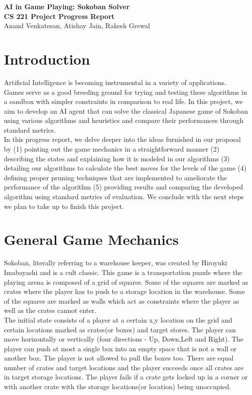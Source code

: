 \documentclass[10pt, final]{article}
\newcommand{\br}[1][.75]{\ \\[#1\baselineskip]}
\begin{document}
	\begin{center}
		\LARGE{\textbf{AI in Game Playing: Sokoban Solver}}\\
		\Large{\textbf{CS 221 Project Progress Report}}\\
		\Large{Anand Venkatesan, Atishay Jain, Rakesh Grewal }
	\end{center}
	\begin{multicols}{2}	
	\section{Introduction}
	Artificial Intelligence is becoming instrumental in a variety of applications. Games serve as a good breeding ground for trying and testing these algorithms in a sandbox with simpler constraints in comparison to real life.	In this project, we aim to develop an AI agent that can solve the classical Japanese game of Sokoban using various algorithms and heuristics
	and compare their performances through standard metrics. \br 
	In this progress report, we delve deeper into the ideas furnished in our proposal by (1) pointing out the game mechanics in a straightforward manner (2) describing the states and explaining how it is modeled in our algorithms (3) detailing our algorithms to calculate the best moves for the levels of the game (4) defining proper pruning techniques that are implemented to ameliorate the performance of the algorithm (5) providing results and comparing the developed algorithm using standard metrics of evaluation. We conclude with the next steps we plan to take up to finish this project.
	
	\section{General Game Mechanics}
Sokoban, literally referring to a warehouse keeper, was created by Hiroyuki Imabayashi and is a cult classic. This game is a transportation puzzle where the playing arena is composed of a grid of squares. Some of the squares are marked as crates where the player has to push to a storage location in the warehouse. Some of the squares are marked as walls which act as constraints where the player as well as the crates cannot enter. \br
The initial state consists of a player at a certain x,y location on the grid and certain locations marked as crates(or boxes) and target stores. The player can move horizontally or vertically (four directions - Up, Down,Left and Right). The player can push at most a single box into an empty space that is not a wall or another box. The player is not allowed to pull the boxes too. There are equal number of crates and target locations and the player succeeds once all crates are in target storage locations. The player fails if a crate gets locked up in a corner or with another crate with the storage locations(or location) being unoccupied.

\end{multicols}
\end{document}
